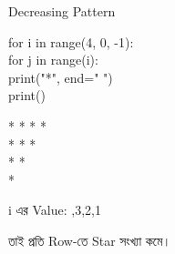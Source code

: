 

\begin{codeoutputbox}{Decreasing Pattern}

\noindent
\begin{minipage}[t]{0.53\linewidth}
\codeheading

\begin{english}
\ttfamily
for i in range(4, 0, -1):\\
\hspace*{4mm}for j in range(i):\\
\hspace*{8mm}print("*", end=" ")\\
\hspace*{4mm}print()
\end{english}

\end{minipage}
\hfill
\begin{minipage}[t]{0.43\linewidth}
\outputheading

\begin{english}
\ttfamily
* * * *\\
* * *\\
* *\\
*
\end{english}

\medskip

\textenglish{\ttfamily i}
এর Value:
\textenglish{,3,2,1}

তাই প্রতি Row-তে Star সংখ্যা কমে।

\end{minipage}

\end{codeoutputbox}



